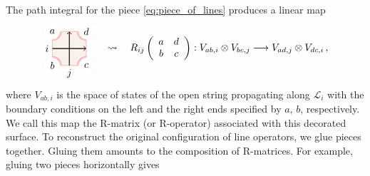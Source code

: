 The path integral for the piece \eqref{eq:piece_of_lines} produces a linear map
\begin{equation}
    \begin{tikzpicture}[scale=0.6, baseline=(x.base)]
        \node (x) at (0,0) {\vphantom{x}};

        \draw[color=red!50, fill=brown!10] (-1,-1) rectangle (1,1);

        \fill[color=white] (-1,1) circle (0.5);  \node (a) at (-1,1) {$a$};
        \draw[draw=red!50, double]  (-1,0.5) arc (-90:0:0.5);
        \fill[color=white] (-1,-1) circle (0.5);  \node (b) at (-1,-1) {$b$};
        \draw[draw=red!50, double]  (-1,-0.5) arc (90:0:0.5);
        \fill[color=white] (1,-1) circle (0.5);  \node (c) at (1,-1) {$c$};
        \draw[draw=red!50, double]  (1,-0.5) arc (90:180:0.5);
        \fill[color=white] (1,1) circle (0.5);  \node (d) at (1,1) {$d$};
        \draw[draw=red!50, double]  (1,0.5) arc (-90:-180:0.5);

        \draw[thick, ->] (-1,0) node[left] {$i$} -- (1,0);
        \draw[thick, ->] (0,-1) node[below] {$j$} -- (0,1);

    \end{tikzpicture}
  \quad \rightsquigarrow \quad
R_{ij}\left(%
  \begin{array}{cc}
        a & d\\
        b & c
  \end{array}%
\right)
  :  V_{ab,i}\otimes V_{bc,j}  \longrightarrow  V_{ad,j}\otimes V_{dc,i} \, ,
\end{equation}
where $V_{ab,i}$ is the space of states of the open string propagating
along $\mathcal{L}_{i}$ with the boundary conditions on the left
and the right ends specified by $a,\,b$, respectively. We call this
map the R-matrix (or R-operator) associated with this decorated surface.
To reconstruct the original configuration of line operators, we glue
pieces together. Gluing them amounts to the composition of R-matrices.
For example, gluing two pieces horizontally gives
